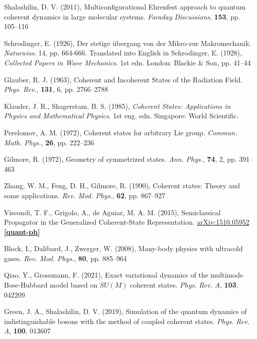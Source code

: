 \documentclass[12pt]{report}
\begin{document}
	\begin{thebibliography}{10}

	
	Shalashilin, D. V. (2011), Multiconfigurational Ehrenfest approach to quantum coherent dynamics in large molecular systems. \textit{Faraday Discussions}, \textbf{153}, pp. 105--116
	
	Schrodinger, E. (1926), Der stetige übergang von der Mikro-zur Makromechanik. \textit{Naturwiss}. 14, pp. 664-666. Translated into English in Schrodinger, E. (1928), \textit{Collected Papers in Wave Mechanics}. 1st edn. London: Blackie \& Son, pp. 41--44
	
	Glauber, R. J. (1963), Coherent and Incoherent States of the Radiation Field. \textit{Phys. Rev.}, \textbf{131}, 6, pp. 2766--2788
	
	Klauder, J. R., Skagerstam, B. S. (1985), \textit{Coherent States: Applications in Physics and Mathematical Physics}. 1st eng. edn. Singapore: World Scientific.
	
	Perelomov, A. M. (1972), Coherent states for arbitrary Lie group. \textit{Commun. Math. Phys.}, \textbf{26}, pp. 222--236
	
	Gilmore, R. (1972), Geometry of symmetrized states. \textit{Ann. Phys.}, \textbf{74}, 2, pp. 391--463
	
	Zhang, W. M., Feng, D. H., Gilmore, R. (1990), Coherent states: Theory and some applications. \textit{Rev. Mod. Phys.}, \textbf{62}, pp. 867--927
	
	Viscondi, T. F., Grigolo, A., de Aguiar, M. A. M. (2015), Semiclassical Propagator in the Generalized Coherent-State Representation. \href{https://doi.org/10.48550/arXiv.1510.05952}{arXiv:1510.05952 \textbf{[quant-ph]}}
	
	Block, I., Dalibard, J., Zwerger, W. (2008), Many-body physics with ultracold gases. \textit{Rev. Mod. Phys.}, \textbf{80}, pp. 885--964
	
	Qiao, Y., Grossmann, F. (2021), Exact variational dynamics of the multimode Bose-Hubbard model based on $SU(M)$ coherent states. \textit{Phys. Rev. A}, \textbf{103}, 042209
	
	Green, J. A., Shalashilin, D. V. (2019), Simulation of the quantum dynamics of indistinguishable bosons with the method of coupled coherent states. \textit{Phys. Rev. A}, \textbf{100}, 013607
	

\end{thebibliography}
\end{document}
